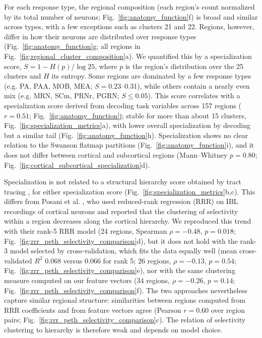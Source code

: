 \documentclass[10pt,lineno]{elife}
\begin{document}
For each response type, the regional composition (each region's count normalized by its total number of neurons; Fig.~\ref{fig:anatomy_function}f) is broad and similar across types, with a few exceptions such as clusters 21 and 22. Regions, however, differ in how their neurons are distributed over response types (Fig.~\ref{fig:anatomy_function}g; all regions in Fig.~\ref{fig:regional_cluster_composition}a). We quantified this by a specialization score, $S=1-H(p)/\log 25$, where $p$ is the region's distribution over the 25 clusters and $H$ its entropy. Some regions are dominated by a few response types (e.g. PA, PAA, MOB, MEA; $S=0.23$--0.31), while others contain a nearly even mix (e.g. MRN, SCm, PRNr, PGRN; $S\leq0.05$). This score correlates with a specialization score derived from decoding task variables \cite{international2025brain} across 157 regions ($r=0.51$; Fig.~\ref{fig:anatomy_function}j; stable for more than about 15 clusters, Fig.~\ref{fig:specialization_metrics}a), with lower overall specialization by decoding but a similar tail (Fig.~\ref{fig:anatomy_function}h). Specialization shows no clear relation to the Swanson flatmap partitions (Fig.~\ref{fig:anatomy_function}i), and it does not differ between cortical and subcortical regions (Mann--Whitney $p=0.80$; Fig.~\ref{fig:cortical_subcortical_specialization}d).

Specialization is not related to a structural hierarchy score obtained by tract tracing \cite{harris2019hierarchical}, for either specialization score (Fig.~\ref{fig:specialization_metrics}b,c). This differs from Posani et al. \cite{posani2026rarely}, who used reduced-rank regression (RRR) on IBL recordings of cortical neurons and reported that the clustering of selectivity within a region decreases along the cortical hierarchy. We reproduced this trend with their rank-5 RRR model (24 regions, Spearman $\rho=-0.48$, $p=0.018$; Fig.~\ref{fig:rrr_peth_selectivity_comparison}d), but it does not hold with the rank-3 model selected by cross-validation, which fits the data equally well (mean cross-validated $R^2$ 0.068 versus 0.066 for rank 5; 26 regions, $\rho=-0.13$, $p=0.54$; Fig.~\ref{fig:rrr_peth_selectivity_comparison}e), nor with the same clustering measure computed on our feature vectors (34 regions, $\rho=-0.26$, $p=0.14$; Fig.~\ref{fig:rrr_peth_selectivity_comparison}f). The two approaches nevertheless capture similar regional structure: similarities between regions computed from RRR coefficients and from feature vectors agree (Pearson $r=0.60$ over region pairs; Fig.~\ref{fig:rrr_peth_selectivity_comparison}c). The relation of selectivity clustering to hierarchy is therefore weak and depends on model choice.
\end{document}
